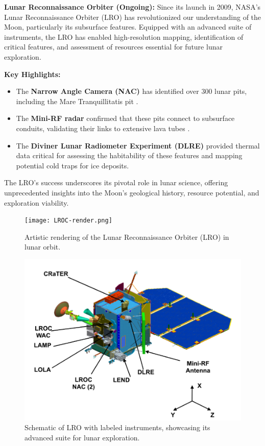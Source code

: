 \textbf{Lunar Reconnaissance Orbiter (Ongoing):} 
Since its launch in 2009, NASA's Lunar Reconnaissance Orbiter (LRO) has revolutionized our understanding of the Moon, particularly its subsurface features. Equipped with an advanced suite of instruments, the LRO has enabled high-resolution mapping, identification of critical features, and assessment of resources essential for future lunar exploration.

\textbf{Key Highlights:}
\begin{itemize}
    \item The \textbf{Narrow Angle Camera (NAC)} has identified over 300 lunar pits, including the Mare Tranquillitatis pit \cite{thermal-lunar-pits}.
    \item The \textbf{Mini-RF radar} confirmed that these pits connect to subsurface conduits, validating their links to extensive lava tubes \cite{new-wagner}.
    \item The \textbf{Diviner Lunar Radiometer Experiment (DLRE)} provided thermal data critical for assessing the habitability of these features and mapping potential cold traps for ice deposits.
\end{itemize}

The LRO’s success underscores its pivotal role in lunar science, offering unprecedented insights into the Moon's geological history, resource potential, and exploration viability.

\begin{figure}[h!]
    \centering
    \begin{minipage}{0.48\textwidth}
        \centering
        \texttt{[image: LROC-render.png]}
        \caption{Artistic rendering of the Lunar Reconnaissance Orbiter (LRO) in lunar orbit.}
        \label{fig:lro_render}
    \end{minipage}
    \hfill
    \begin{minipage}{0.48\textwidth}
        \centering
        \includegraphics[width=\textwidth]{LROC-schema.png}
        \caption{Schematic of LRO with labeled instruments, showcasing its advanced suite for lunar exploration.}
        \label{fig:lro_schema}
    \end{minipage}
\end{figure}

